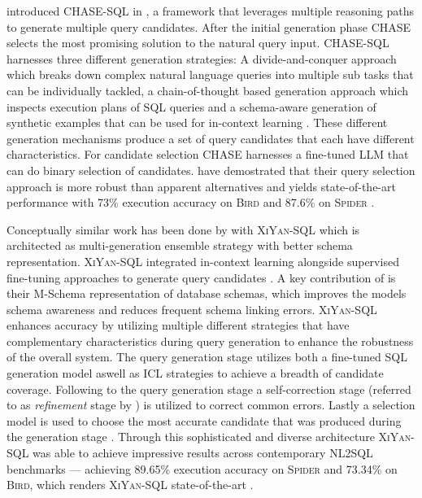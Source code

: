 \documentclass{article}
\begin{document}
\cite{CHASE} introduced CHASE-SQL in \citeyear{CHASE}, a framework that leverages multiple reasoning paths to generate multiple
query candidates. After the initial generation phase CHASE selects the most promising solution to the natural query input.
CHASE-SQL harnesses three different generation strategies: A divide-and-conquer approach which breaks down complex natural
language queries into multiple sub tasks that can be individually tackled, a chain-of-thought based generation approach which
inspects execution plans of SQL queries and a schema-aware generation of synthetic examples that can be used for in-context
learning \citep{CHASE}. These different generation mechanisms produce a set of query candidates that each have different
characteristics. For candidate selection CHASE harnesses a fine-tuned LLM that can do binary selection of candidates.
\citeauthor{CHASE} have demostrated that their query selection approach is more robust than apparent alternatives and yields
state-of-the-art performance with 73\% execution accuracy on \textsc{Bird} and 87.6\% on \textsc{Spider} \citep{CHASE}.

Conceptually similar work has been done by \citeauthor*{XiYan} with \textsc{XiYan-SQL} which is architected as multi-generation
ensemble strategy with better schema representation. \textsc{XiYan-SQL} integrated in-context learning alongside supervised
fine-tuning approaches to generate query candidates \citep{XiYan}. A key contribution of \cite{XiYan} is their M-Schema
representation of database schemas, which improves the models schema awareness and reduces frequent schema linking errors.
\textsc{XiYan-SQL} enhances accuracy by utilizing multiple different strategies that have complementary characteristics
during query generation to enhance the robustness of the overall system. The query generation stage utilizes both a
fine-tuned SQL generation model aswell as ICL strategies to achieve a breadth of candidate coverage. Following to the query
generation stage a self-correction stage (referred to as \textit{refinement} stage by \citeauthor{XiYan}) is utilized
to correct common errors. Lastly a selection model is used to choose the most accurate candidate that was produced
during the generation stage \citep{XiYan}. Through this sophisticated and diverse architecture \textsc{XiYan-SQL} was
able to achieve impressive results across contemporary NL2SQL benchmarks — achieving 89.65\% execution accuracy on
\textsc{Spider} and 73.34\% on \textsc{Bird}, which renders \textsc{XiYan-SQL} state-of-the-art \citep{XiYan}.
\end{document}
